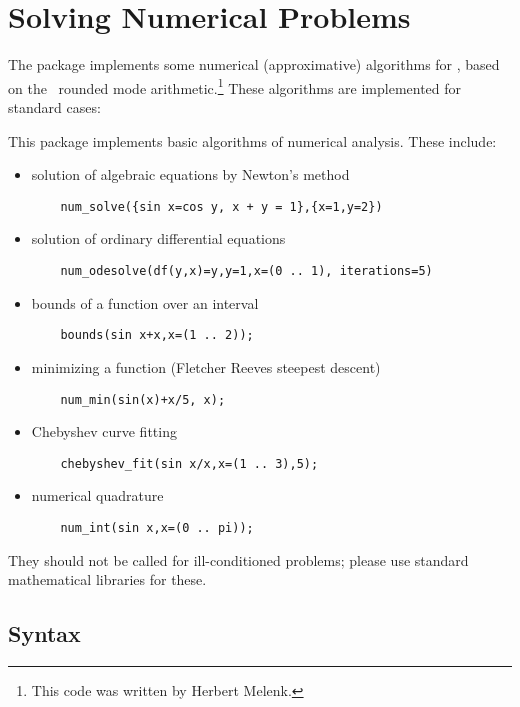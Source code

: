 
\chapter{Solving Numerical Problems}



The  package implements some numerical (approximative)
algorithms for \REDUCE, based on the \REDUCE\ rounded mode
arithmetic.\footnote{This code was written by Herbert Melenk.}
These algorithms are implemented for standard cases:

This package implements basic algorithms of numerical analysis.
These include:
\begin{itemize}
\item solution of algebraic equations by Newton's method
\begin{verbatim}
    num_solve({sin x=cos y, x + y = 1},{x=1,y=2})
\end{verbatim}
\item solution of ordinary differential equations
\begin{verbatim}
    num_odesolve(df(y,x)=y,y=1,x=(0 .. 1), iterations=5)
\end{verbatim}
\item bounds of a function over an interval
\begin{verbatim}
    bounds(sin x+x,x=(1 .. 2));
\end{verbatim}
\item minimizing a function (Fletcher Reeves steepest descent)
\begin{verbatim}
    num_min(sin(x)+x/5, x);
\end{verbatim}
\item Chebyshev curve fitting
\begin{verbatim}
    chebyshev_fit(sin x/x,x=(1 .. 3),5);
\end{verbatim}
\item numerical quadrature
\begin{verbatim}
    num_int(sin x,x=(0 .. pi));
\end{verbatim}
\end{itemize}
They should not be called for ill-conditioned problems;
please use standard mathematical libraries for
these.


\section{Syntax}

